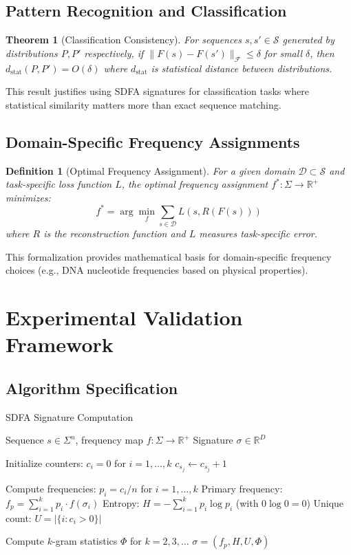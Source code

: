 \documentclass[11pt]{article}
\newtheorem{definition}{Definition}
\newtheorem{theorem}{Theorem}
\newcommand{\sdfa}{\textsc{SDFA}}
\newcommand{\seqspace}{\mathcal{S}}
\newcommand{\freqspace}{\mathcal{F}}
\newcommand{\alphabet}{\Sigma}
\newcommand{\real}{\mathbb{R}}
\begin{document}
\subsection{Pattern Recognition and Classification}

\begin{theorem}[Classification Consistency]
For sequences $s, s' \in \seqspace$ generated by distributions $P, P'$ respectively, if $\|F(s) - F(s')\|_{\freqspace} \leq \delta$ for small $\delta$, then $d_{\text{stat}}(P, P') = O(\delta)$ where $d_{\text{stat}}$ is statistical distance between distributions.
\end{theorem}

This result justifies using \sdfa{} signatures for classification tasks where statistical similarity matters more than exact sequence matching.

\subsection{Domain-Specific Frequency Assignments}

\begin{definition}[Optimal Frequency Assignment]
For a given domain $\mathcal{D} \subset \seqspace$ and task-specific loss function $L$, the optimal frequency assignment $f^*: \alphabet \to \real^+$ minimizes:
\[f^* = \arg\min_f \sum_{s \in \mathcal{D}} L(s, R(F(s)))\]
where $R$ is the reconstruction function and $L$ measures task-specific error.
\end{definition}

This formalization provides mathematical basis for domain-specific frequency choices (e.g., DNA nucleotide frequencies based on physical properties).

\section{Experimental Validation Framework}

\subsection{Algorithm Specification}

\begin{algorithm}
\caption{SDFA Signature Computation}
\begin{algorithmic}[1]
\REQUIRE Sequence $s \in \alphabet^n$, frequency map $f: \alphabet \to \real^+$
\ENSURE Signature $\sigma \in \real^D$

\STATE Initialize counters: $c_i = 0$ for $i = 1, \ldots, k$
    \STATE $c_{s_j} \leftarrow c_{s_j} + 1$
\ENDFOR

\STATE Compute frequencies: $p_i = c_i / n$ for $i = 1, \ldots, k$
\STATE Primary frequency: $f_p = \sum_{i=1}^k p_i \cdot f(\sigma_i)$
\STATE Entropy: $H = -\sum_{i=1}^k p_i \log p_i$ (with $0 \log 0 = 0$)
\STATE Unique count: $U = |\{i : c_i > 0\}|$

\STATE Compute $k$-gram statistics $\Phi$ for $k = 2, 3, \ldots$
\RETURN $\sigma = (f_p, H, U, \Phi)$
\end{algorithmic}
\end{algorithm}
\end{document}
